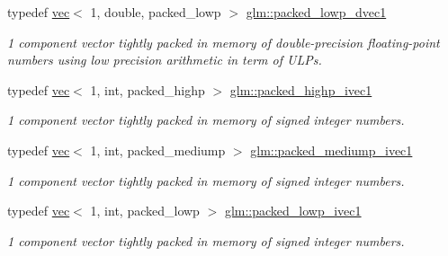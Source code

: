 \begin{DoxyCompactItemize}
\mbox{\label{group__gtc__type__aligned_gab43886895b98688f4ebbc395e5a633ff}} 
typedef \hyperlink{structglm_1_1vec}{vec}$<$ 1, double, packed\+\_\+lowp $>$ \hyperlink{group__gtc__type__aligned_gab43886895b98688f4ebbc395e5a633ff}{glm\+::packed\+\_\+lowp\+\_\+dvec1}
\begin{DoxyCompactList}\small\item\em 1 component vector tightly packed in memory of double-\/precision floating-\/point numbers using low precision arithmetic in term of U\+L\+Ps. \end{DoxyCompactList}\item 
\mbox{\label{group__gtc__type__aligned_ga7fde67656fb5726169114054992f0a3f}} 
typedef \hyperlink{structglm_1_1vec}{vec}$<$ 1, int, packed\+\_\+highp $>$ \hyperlink{group__gtc__type__aligned_ga7fde67656fb5726169114054992f0a3f}{glm\+::packed\+\_\+highp\+\_\+ivec1}
\begin{DoxyCompactList}\small\item\em 1 component vector tightly packed in memory of signed integer numbers. \end{DoxyCompactList}\item 
\mbox{\label{group__gtc__type__aligned_ga2086cbb8b85fe406f4be46fdff491304}} 
typedef \hyperlink{structglm_1_1vec}{vec}$<$ 1, int, packed\+\_\+mediump $>$ \hyperlink{group__gtc__type__aligned_ga2086cbb8b85fe406f4be46fdff491304}{glm\+::packed\+\_\+mediump\+\_\+ivec1}
\begin{DoxyCompactList}\small\item\em 1 component vector tightly packed in memory of signed integer numbers. \end{DoxyCompactList}\item 
\mbox{\label{group__gtc__type__aligned_ga259a03c1d585f918f04230dde51cc95a}} 
typedef \hyperlink{structglm_1_1vec}{vec}$<$ 1, int, packed\+\_\+lowp $>$ \hyperlink{group__gtc__type__aligned_ga259a03c1d585f918f04230dde51cc95a}{glm\+::packed\+\_\+lowp\+\_\+ivec1}
\begin{DoxyCompactList}\small\item\em 1 component vector tightly packed in memory of signed integer numbers. \end{DoxyCompactList}\item 

\end{DoxyCompactItemize}
